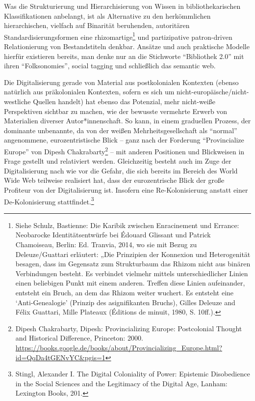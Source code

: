 \documentclass[a4paper,
fontsize=11pt,
oneside,
numbers=noperiodatend,
parskip=half-,
bibliography=totoc,
final
]{scrartcl}
\begin{document}
Was die Strukturierung und Hierarchisierung von Wissen in
bibliothekarischen Klassifikationen anbelangt, ist als Alternative zu
den herkömmlichen hierarchischen, vielfach auf Binarität beruhenden,
autoritären Standardisierungsformen eine rhizomartige\footnote{Siehe
  Schulz, Bastienne: Die Karibik zwischen Enracinement und Errance:
  Neobarocke Identitätsentwürfe bei Édouard Glissant und Patrick
  Chamoiseau, Berlin: Ed. Tranvia, 2014, wo sie mit Bezug zu
  Deleuze/Guattari erläutert: „Die Prinzipien der Konnexion und
  Heterogenität besagen, dass im Gegensatz zum Strukturbaum das Rhizom
  nicht aus binären Verbindungen besteht. Es verbindet vielmehr mittels
  unterschiedlicher Linien einen beliebigen Punkt mit einem anderen.
  Treffen diese Linien aufeinander, entsteht ein Bruch, an dem das
  Rhizom weiter wuchert. Es entsteht eine \enquote*{Anti-Genealogie}
  (Prinzip des asignifikanten Bruchs), Gilles Deleuze and Félix
  Guattari, Mille Plateaux (Éditions de minuit, 1980, S. 10ff.).} und
partizipative patron-driven Relationierung von Bestandstiteln denkbar.
Ansätze und auch praktische Modelle hierfür existieren bereits, man
denke nur an die Stichworte \enquote{Bibliothek 2.0} mit ihren
\enquote{Folksonomies}, social tagging und schließlich das semantic web.

Die Digitalisierung gerade von Material aus postkolonialen Kontexten
(ebenso natürlich aus präkolonialen Kontexten, sofern es sich um
nicht-europäische/nicht-westliche Quellen handelt) hat ebenso das
Potenzial, mehr nicht-weiße Perspektiven sichtbar zu machen, wie der
bewusste vermehrte Erwerb von Materialien diverser Autor*innenschaft. So
kann, in einem graduellen Prozess, der dominante unbenannte, da von der
weißen Mehrheitsgesellschaft als \enquote{normal} angenommene,
eurozentristische Blick -- ganz nach der Forderung
\enquote{Provincialize Europe} von Dipesh Chakrabarty\footnote{Dipesh
  Chakrabarty, Dipesh: Provincializing Europe: Postcolonial Thought and
  Historical Difference, Princeton: 2000.
  \url{https://books.google.de/books/about/Provincializing_Europe.html?id=QqDa4tGENvYC\&pgis=1}}
-- mit anderen Positionen und Blickweisen in Frage gestellt und
relativiert werden. Gleichzeitig besteht auch im Zuge der
Digitalisierung nach wie vor die Gefahr, die sich bereits im Bereich des
World Wide Web teilweise realisiert hat, dass der eurozentrische Blick
der große Profiteur von der Digitalisierung ist. Insofern eine
Re-Kolonisierung anstatt einer De-Kolonisierung stattfindet.\footnote{Stingl,
  Alexander I. The Digital Coloniality of Power: Epistemic Disobedience
  in the Social Sciences and the Legitimacy of the Digital Age, Lanham:
  Lexington Books, 201.}
\end{document}
